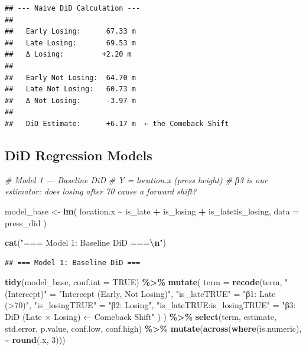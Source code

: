 \documentclass[
]{article}
\newenvironment{Shaded}{\begin{snugshade}}{\end{snugshade}}
\newcommand{\AttributeTok}[1]{\textcolor[rgb]{0.13,0.29,0.53}{#1}}
\newcommand{\CommentTok}[1]{\textcolor[rgb]{0.56,0.35,0.01}{\textit{#1}}}
\newcommand{\ConstantTok}[1]{\textcolor[rgb]{0.56,0.35,0.01}{#1}}
\newcommand{\DecValTok}[1]{\textcolor[rgb]{0.00,0.00,0.81}{#1}}
\newcommand{\FunctionTok}[1]{\textcolor[rgb]{0.13,0.29,0.53}{\textbf{#1}}}
\newcommand{\NormalTok}[1]{#1}
\newcommand{\OtherTok}[1]{\textcolor[rgb]{0.56,0.35,0.01}{#1}}
\newcommand{\SpecialCharTok}[1]{\textcolor[rgb]{0.81,0.36,0.00}{\textbf{#1}}}
\newcommand{\StringTok}[1]{\textcolor[rgb]{0.31,0.60,0.02}{#1}}
\begin{document}
\begin{verbatim}
## --- Naive DiD Calculation ---
## 
##   Early Losing:      67.33 m
##   Late Losing:       69.53 m
##   Δ Losing:         +2.20 m
## 
##   Early Not Losing:  64.70 m
##   Late Not Losing:   60.73 m
##   Δ Not Losing:      -3.97 m
## 
##   DiD Estimate:      +6.17 m  ← the Comeback Shift
\end{verbatim}

\subsection{DiD Regression Models}\label{did-regression-models}

\begin{Shaded}
\begin{Highlighting}[]
\CommentTok{\# Model 1 — Baseline DiD}
\CommentTok{\# Y = location.x (press height)}
\CommentTok{\# β3 is our estimator: does losing after 70\textquotesingle{} cause a forward shift?}

\NormalTok{model\_base }\OtherTok{\textless{}{-}} \FunctionTok{lm}\NormalTok{(}
\NormalTok{  location.x }\SpecialCharTok{\textasciitilde{}}\NormalTok{ is\_late }\SpecialCharTok{+}\NormalTok{ is\_losing }\SpecialCharTok{+}\NormalTok{ is\_late}\SpecialCharTok{:}\NormalTok{is\_losing,}
  \AttributeTok{data =}\NormalTok{ press\_did}
\NormalTok{)}

\FunctionTok{cat}\NormalTok{(}\StringTok{"=== Model 1: Baseline DiD ===}\SpecialCharTok{\textbackslash{}n}\StringTok{"}\NormalTok{)}
\end{Highlighting}
\end{Shaded}

\begin{verbatim}
## === Model 1: Baseline DiD ===
\end{verbatim}

\begin{Shaded}
\begin{Highlighting}[]
\FunctionTok{tidy}\NormalTok{(model\_base, }\AttributeTok{conf.int =} \ConstantTok{TRUE}\NormalTok{) }\SpecialCharTok{\%\textgreater{}\%}
  \FunctionTok{mutate}\NormalTok{(}
    \AttributeTok{term =} \FunctionTok{recode}\NormalTok{(term,}
      \StringTok{"(Intercept)"}           \OtherTok{=} \StringTok{"Intercept (Early, Not Losing)"}\NormalTok{,}
      \StringTok{"is\_lateTRUE"}           \OtherTok{=} \StringTok{"β1: Late (\textgreater{}70\textquotesingle{})"}\NormalTok{,}
      \StringTok{"is\_losingTRUE"}         \OtherTok{=} \StringTok{"β2: Losing"}\NormalTok{,}
      \StringTok{"is\_lateTRUE:is\_losingTRUE"} \OtherTok{=} \StringTok{"β3: DiD (Late × Losing) ← Comeback Shift"}
\NormalTok{    )}
\NormalTok{  ) }\SpecialCharTok{\%\textgreater{}\%}
  \FunctionTok{select}\NormalTok{(term, estimate, std.error, p.value, conf.low, conf.high) }\SpecialCharTok{\%\textgreater{}\%}
  \FunctionTok{mutate}\NormalTok{(}\FunctionTok{across}\NormalTok{(}\FunctionTok{where}\NormalTok{(is.numeric), }\SpecialCharTok{\textasciitilde{}} \FunctionTok{round}\NormalTok{(.x, }\DecValTok{3}\NormalTok{)))}
\end{Highlighting}
\end{Shaded}
\end{document}
